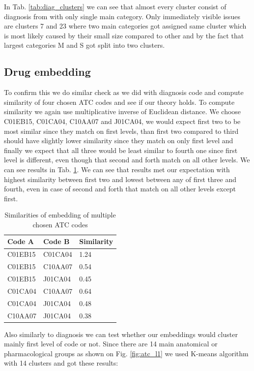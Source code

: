 In Tab. \ref{tab:diag_clusters} we can see that almost every cluster consist of diagnosis from with only single main category. Only immediately visible issues are clusters 7 and 23 where two main categories got assigned same cluster which is most likely caused by their small size compared to other and by the fact that largest categories M and S got split into two clusters.

\subsection{Drug embedding}

To confirm this we do similar check as we did with diagnosis code and compute similarity of four chosen ATC codes and see if our theory holds. To compute similarity we again use multiplicative inverse of Euclidean distance. We choose C01EB15, C01CA04, C10AA07 and J01CA04, we would expect first two to be most similar since they match on first levels, than first two compared to third should have slightly lower similarity since they match on only first level and finally we expect that all three would be least similar to fourth one since first level is different, even though that second and forth match on all other levels.  We can see results in Tab. \ref{tab:drug_emb_show}. We can see that results met our expectation with highest similarity between first two and lowest between any of first three and fourth, even in case of second and forth that match on all other levels except first.

\begin{table}[!h]
	\centering
	\begin{tabular}{|l|l|l|}
		\hline
		Code A & Code B & Similarity \\ \hline
		C01EB15 & C01CA04 & 1.24      \\ \hline
		C01EB15 & C10AA07 & 0.54       \\ \hline
		C01EB15 & J01CA04 & 0.45       \\ \hline
		C01CA04 & C10AA07 & 0.64       \\ \hline
		C01CA04 & J01CA04 & 0.48       \\ \hline
		C10AA07 & J01CA04 & 0.38       \\ \hline
	\end{tabular}
	\caption{Similarities of embedding of multiple chosen ATC codes}
	\label{tab:drug_emb_show}
\end{table}  

Also similarly to diagnosis we can test whether our embeddings would cluster mainly first level of code or not. Since there are 14 main anatomical or pharmacological groups as shown on Fig. \ref{fig:atc_l1} we used K-means algorithm with 14 clusters and got these results:
\\

